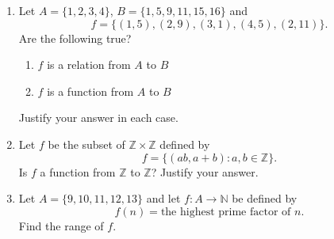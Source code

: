 \documentclass[11pt]{article}
\begin{document}
\begin{enumerate}
\item Let $A=\{1,2,3,4\}$, $B=\{1,5,9,11,15,16\}$ and
\[
f=\{(1,5),(2,9),(3,1),(4,5),(2,11)\}.
\]
Are the following true?
\begin{enumerate}
\item $f$ is a relation from $A$ to $B$
\item $f$ is a function from $A$ to $B$
\end{enumerate}
Justify your answer in each case.

\item Let $f$ be the subset of $\mathbb{Z}\times\mathbb{Z}$ defined by
\[
f=\{(ab,a+b):a,b\in\mathbb{Z}\}.
\]
Is $f$ a function from $\mathbb{Z}$ to $\mathbb{Z}$? Justify your answer.

\item Let $A=\{9,10,11,12,13\}$ and let $f:A\to\mathbb{N}$ be defined by
\[
f(n)=\text{the highest prime factor of }n.
\]
Find the range of $f$.

\end{enumerate}

\vspace{0.5cm}
\end{document}
